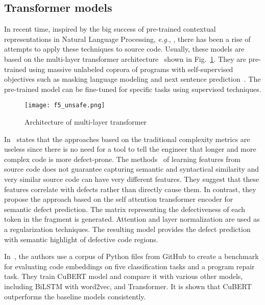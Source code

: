 \documentclass{article}
\begin{document}
\subsection{Transformer models}

In recent time, inspired by the big success of pre-trained contextual representations in Natural Language Processing, \textit{e.g.}, \cite{liu2019roberta}, there has been a rise of attempts to apply these techniques to source code. Usually, these models are based on the multi-layer transformer architecture~\cite{vaswani2017attention} shown in Fig.~\ref{fig5}. They are pre-trained using massive unlabeled coprora of programs with self-supervised objectives such as masking language modeling and next sentence prediction~\cite{KanadeEtAl2019,FengEtAl2020}. The pre-trained model can be fine-tuned for specific tasks using supervised techniques.

\begin{figure}[ht] %
\texttt{[image: f5\_unsafe.png]}
\caption{Architecture of multi-layer transformer}
\label{fig5} %
\end{figure}

In~\cite{HumphreysDam2019} states that the approaches based on the traditional complexity metrics are useless since there is no need for a tool to tell the engineer that longer and more complex code is more defect-prone.
The methods~\cite{WangEtAl2016} of learning features from source code does not guarantee capturing semantic and syntactical similarity and very similar source code can have very different features. They suggest that these features correlate with defects rather than directly cause them. 
In contrast, they propose the approach based on the self attention transformer encoder for semantic defect prediction. The matrix representing the defectiveness of each token in the fragment is generated. Attention and layer normalization are used as a regularization techniques. The resulting model provides the defect prediction with semantic highlight of defective code regions.

In~\cite{KanadeEtAl2019}, the authors use a corpus of Python files from GitHub to create
a benchmark for evaluating code embeddings on five classification tasks and a program repair task.
They train CuBERT model and compare it with various other models, including BiLSTM with word2vec, and Transformer.
It is shown that CuBERT outperforms the baseline models consistently.
\end{document}
